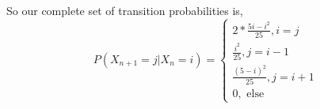 \documentclass{article}
\begin{document}
So our complete set of transition probabilities is,
\[
P(X_{n+1} = j | X_n = i) = \begin{cases}
2*\frac{5i - i^2}{25} , i = j\\
\frac{i^2}{25} , j = i -1\\
\frac{(5-i)^2}{25} , j = i +1\\
0 , \text{ else}
\end{cases}
\]
\end{document}
